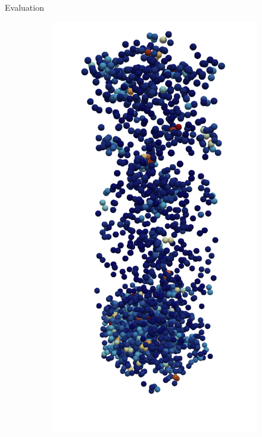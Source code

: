 \begin{frame}[c]{Evaluation}{}
{\begin{figure}[htpb]
\begin{subfigure}[c]{.2\textwidth}
			\vspace{-1cm}
		\end{subfigure}%
		\begin{subfigure}[c]{.2\textwidth}
			\centering
			\vspace{-1cm}
			\includegraphics[width=\textwidth]{exploding-liquid/render/t31000.png}

\end{subfigure}
\end{figure}}
\end{frame}
